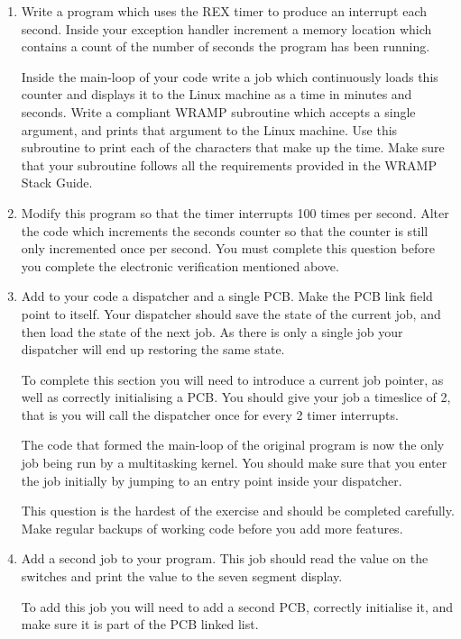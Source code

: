 \documentclass[a4paper,10pt]{article}
\begin{document}
\begin{enumerate}
\item Write a program which uses the REX timer to produce an interrupt
each second. Inside your exception handler increment a memory location
which contains a count of the number of seconds the program has been
running.

Inside the main-loop of your code write a job which continuously loads
this counter and displays it to the Linux machine as a time in minutes
and seconds. Write a compliant WRAMP subroutine which accepts a single
argument, and prints that argument to the Linux machine. Use this
subroutine to print each of the characters that make up the time. Make
sure that your subroutine follows all the requirements provided in the
WRAMP Stack Guide.

\item
\label{ques:parta}

Modify this program so that the timer interrupts 100 times per
second. Alter the code which increments the seconds counter so that
the counter is still only incremented once per second. You must
complete this question before you complete the electronic verification
mentioned above.

\item Add to your code a dispatcher and a single PCB. Make the PCB
link field point to itself. Your dispatcher should save the state of
the current job, and then load the state of the next job. As there is
only a single job your dispatcher will end up restoring the same
state.

To complete this section you will need to introduce a current job
pointer, as well as correctly initialising a PCB. You should give your
job a timeslice of 2, that is you will call the dispatcher once for
every 2 timer interrupts.

The code that formed the main-loop of the original program is now the
only job being run by a multitasking kernel. You should make sure that
you enter the job initially by jumping to an entry point inside your
dispatcher.

This question is the hardest of the exercise and should be completed
carefully. Make regular backups of working code before you add more
features.

\item Add a second job to your program. This job should read the value
on the switches and print the value to the seven segment display.

To add this job you will need to add a second PCB, correctly
initialise it, and make sure it is part of the PCB linked list.


\end{enumerate}
\end{document}
